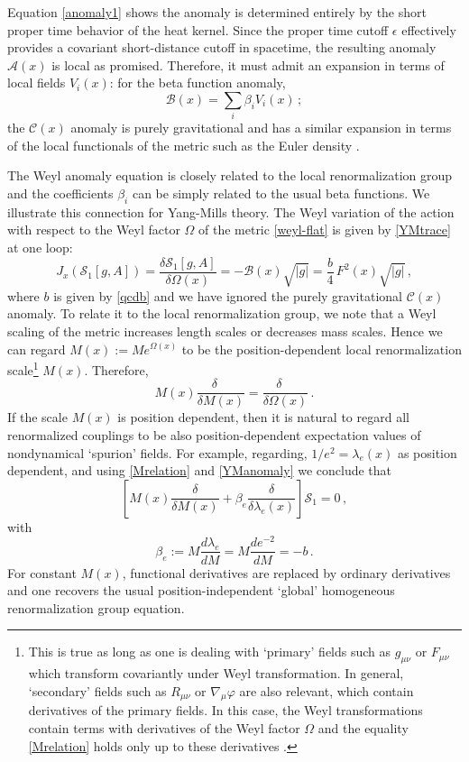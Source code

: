 \documentclass[12pt,a4paper]{article}
\newcommand{\be}{\begin{equation}}
\newcommand{\ee}{\end{equation}}
\newcommand{\cA}{\mathcal{A}}
\newcommand{\cB}{\mathcal{B}}
\newcommand{\cC}{\mathcal{C}}
\newcommand{\cS}{\mathcal{S}}
\renewcommand{\b}{\beta}
\renewcommand{\d}{\delta}
\newcommand{\e}{\epsilon}
\renewcommand{\l}{\lambda}
\newcommand{\m}{\mu}
\newcommand{\n}{\nu}
\renewcommand{\O}{\Omega}
\newcommand{\1}{{\textbf{1}}}
\newcommand{\+}{{\,+ \,}}
\begin{document}
Equation \eqref{anomaly1} shows  the anomaly  is determined entirely by the short proper time behavior of the heat kernel. Since the proper time cutoff $\e$ effectively provides a covariant short-distance cutoff in spacetime, the resulting anomaly $\cA(x)$ is local as promised.  Therefore, it must admit an expansion in terms of local fields $V_{i}(x)$: for the beta function anomaly,
\be
\cB(x) =  \sum_{i}\beta_{i} V_{i}(x)  \, ;
\ee
the $\cC(x)$ anomaly is  purely gravitational and has a similar expansion in terms of the local functionals of the metric such as the Euler density \cite{Capper:1973mv, Deser:1976yx,Duff:1993wm}.

The Weyl anomaly equation is closely related to the local renormalization group  \cite{Drummond:1977dg,Osborn:1991gm,Jack:1990eb} and  the coefficients $\b_{i}$ can be simply related to the usual beta functions. We illustrate this connection for Yang-Mills theory. The  Weyl variation of the action with respect to the Weyl factor $\O$ of the metric  \eqref{weyl-flat} 
is given by \eqref{YMtrace} at one loop:
\be\label{YManomaly}
J_{x}( \cS_{1} [g, A]) = \frac{\delta \cS_{1} [g, A]}{\delta \Omega(x)} =  -\cB(x) \sqrt{|g|} =   \frac{b}{4}   \,  F^{2} (x)  \sqrt{|g|}\, ,
\ee
where $b$ is given by \eqref{qcdb} and we have ignored  the purely gravitational $\cC(x)$ anomaly. To relate it to
the local renormalization group, we note that a Weyl scaling of the metric increases length scales or decreases mass scales. Hence we can regard $M(x):= Me^{\Omega(x)}$ to be the position-dependent local renormalization scale\footnote{This is true as long as one is dealing with `primary' fields such as  $g_{\m\n}$ or $F_{\m\n}$ which transform covariantly under Weyl transformation. In general,  `secondary' fields such as $R_{\m\n}$ or $\nabla_{\m}\varphi$ are also relevant, which contain derivatives of the primary fields. In this case, the Weyl transformations contain terms with derivatives of the Weyl factor $\Omega$ and the equality \eqref{Mrelation} holds only up to these derivatives \cite{Drummond:1977dg,Shore:1986hk,Shore:1990wp,Osborn:1987au,Osborn:1989td, Osborn:1991gm,Benevides:2017a}.}  $M(x)$.  
Therefore, 
 \be\label{Mrelation}
M(x) \frac{\d\quad}{\d M(x)} =  \frac{\d\quad}{\d\Omega(x)}  \, .
 \ee
If the  scale $M(x)$ is position dependent, then it is natural to regard all renormalized couplings to be also position-dependent expectation values of  nondynamical `spurion’ fields. For example, regarding, $1/e^{2} = \l_{e}(x)$ as position dependent, and using \eqref{Mrelation} and \eqref{YManomaly} we conclude that
\be
 \left[M(x)\frac{\d}{\d M(x)} +\b_{e}\frac{\d }{\d \l_{e}(x)}\right]\cS_{1}=0 \, ,
\ee
with 
\be\label{RG}
\b_{e}:=M \frac{d \l_{e}}{dM}= M \frac{d e^{-2}}{dM} = -b \, .
\ee
For constant $M(x)$, functional derivatives are replaced by ordinary derivatives and one recovers the usual position-independent `global' homogeneous renormalization group equation. 
\end{document}
